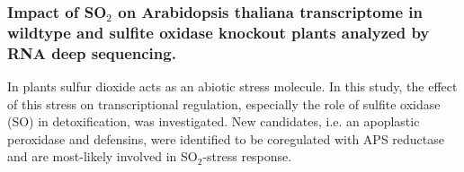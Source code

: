 \subsubsection{Impact of SO$_2$ on Arabidopsis thaliana transcriptome in wildtype and sulfite oxidase knockout plants analyzed by RNA deep sequencing.\cite{mp_Hamisch2012}}
In plants sulfur dioxide acts as an abiotic stress molecule.
In this study, the effect of this stress on transcriptional regulation, especially the role of sulfite oxidase (SO) in detoxification, was investigated.
New candidates, i.e. an apoplastic peroxidase and defensins, were identified to be coregulated with APS reductase and are most-likely involved in SO$_2$-stress response.






